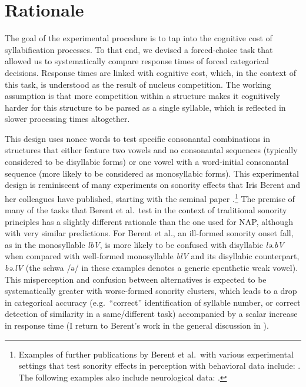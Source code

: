 \section{Rationale}\label{sec:rationale}

The goal of the experimental procedure is to tap into the cognitive cost of syllabification processes. To that end, we devised a forced-choice task that allowed us to systematically compare response times of forced categorical decisions. Response times are linked with cognitive cost, which, in the context of this task, is understood as the result of nucleus competition. The working assumption is that more competition within a structure makes it cognitively harder for this structure to be parsed as a single syllable, which is reflected in slower processing times altogether.

This design uses nonce words to test specific consonantal combinations in structures that either feature two vowels and no consonantal sequences (typically considered to be disyllabic forms) or one vowel with a word-initial consonantal sequence (more likely to be considered as monosyllabic forms).
This experimental design is reminiscent of many experiments on sonority effects that Iris Berent and her colleagues have published, starting with the seminal paper \citet{berent2007we}.\footnote{Examples of further publications by Berent et al.~with various experimental settings that test sonority effects in perception with behavioral data include: \citet{berent2008language, berent2010phonological, berent2011syllable, berent2012language, berent2013phnological, tamasi2014sensitivity, zhao2015universalsk, lennertz2015onthesonority}. The following examples also include neurological data: \citet{berent2014languagesk, gomez2014language, berent2015role}.} The premise of many of the tasks that Berent et al.~test in the context of traditional sonority principles has a slightly different rationale than the one used for NAP, although with very similar predictions. For Berent et al., an ill-formed sonority onset fall, as in the monosyllable \emph{lbV}, is more likely to be confused with disyllabic \emph{lə.bV} when compared with well-formed monosyllable \emph{blV} and its disyllabic counterpart, \emph{bə.lV} (the schwa /ə/ in these examples denotes a generic epenthetic weak vowel). This misperception and confusion between alternatives is expected to be systematically greater with worse-formed sonority clusters, which leads to a drop in categorical accuracy (e.g.~\enquote{correct} identification of syllable number, or correct detection of similarity in a same/different task) accompanied by a scalar increase in response time (I return to Berent's work in the general discussion in ).

